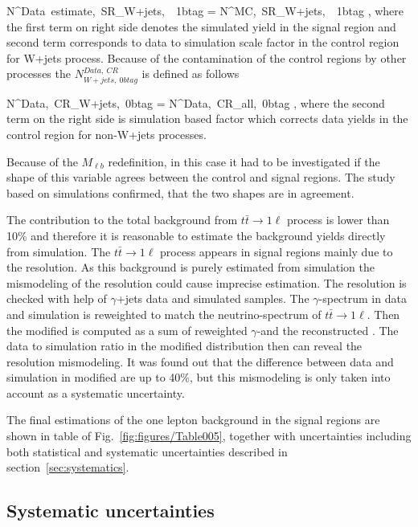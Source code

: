 {
N^{Data~estimate,~SR}_{W+jets,~\geq~1btag}  = N^{MC,~SR}_{W+jets,~\geq~1btag} \times  {},
}
where the first term on right side denotes the simulated yield in the signal region and second term corresponds to data to simulation scale factor in the control region for W+jets process. Because of the contamination of the control regions by other processes the $N^{Data,~CR}_{W+jets,~0btag}$ is defined as follows


{
N^{Data,~CR}_{W+jets,~0btag} = N^{Data,~CR}_{all,~0btag} \times {} ,
}
where the second term on the right side is simulation based factor which corrects data yields in the control region for non-W+jets processes.

Because of the $M_{\ell b}$ redefinition, in this case it had to be investigated if the shape of this variable agrees between the control and signal regions. The study based on simulations confirmed, that the two shapes are in agreement. 

The contribution to the total background from $t\bar{t} \to 1\ell$ process is lower than 10\% and therefore it is reasonable to estimate the background yields directly from simulation. The $t\bar{t} \to 1\ell$ process appears in signal regions mainly due to the \MET resolution. As this background is purely estimated from simulation the mismodeling of the \MET resolution could cause imprecise estimation. The \MET resolution is checked with help of $\gamma$+jets data and simulated samples. The $\gamma$-\pt spectrum in data and simulation is reweighted to match the neutrino-\pt spectrum of $t\bar{t} \to 1\ell$. Then the modified \MET is computed as a sum of reweighted $\gamma$-\pt and the reconstructed \MET. The data to simulation ratio in the modified \MET distribution then can reveal the \MET resolution mismodeling. It was found out that the difference between data and simulation in modified \MET are up to 40\%, but this mismodeling is only taken into account as a systematic uncertainty. %
 
The final estimations of the one lepton background in the signal regions are shown in table of Fig.~\ref{fig:figures/Table005}, together with uncertainties including both statistical and systematic uncertainties described in section~\ref{sec:systematics}.

\subsection{Systematic uncertainties~\label{sec:systematics}}

